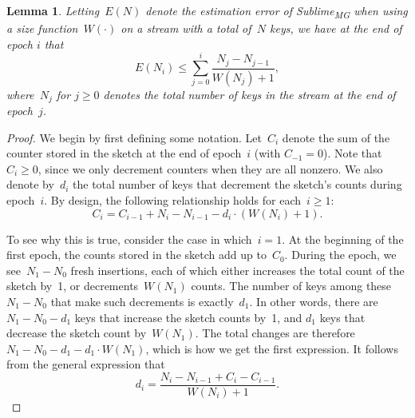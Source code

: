 \documentclass[sigconf]{acmart}
\newtheorem{lemma}[theorem]{Lemma}
\newcommand{\sketch}{Sublime}
\newcommand{\sketchmg}{\sketch\textsubscript{MG}\xspace}
\begin{document}
\begin{lemma}
    \label{lemma:mg-w}
    Letting~$E(N)$ denote the estimation error of \sketchmg when using a size
    function~$W(\cdot)$ on a stream with a total of~$N$ keys, we have at the
    end of epoch $i$ that
    $$ E(N_i) \leq \sum_{j=0}^i \frac{N_j - N_{j-1}}{W(N_j)+1},$$
    where~$N_{j}$ for $j\geq 0$ denotes the total number of keys in the stream
    at the end of epoch~$j$.
\end{lemma}
\begin{proof}
    We begin by first defining some notation. Let~$C_i$ denote the sum of the
    counter stored in the sketch at the end of epoch~$i$ (with $C_{-1}=0$).
    Note that $C_i \geq 0$, since we only decrement counters when they are all
    nonzero. We also denote by~$d_i$ the total number of keys that decrement
    the sketch's counts during epoch~$i$. By design, the following relationship
    holds for each~$i\geq 1$:
    $$ C_i = C_{i-1} + N_i - N_{i-1} - d_i \cdot (W(N_i)+1). $$

    To see why this is true, consider the case in which~$i=1$. At the beginning
    of the first epoch, the counts stored in the sketch add up to~$C_0$. During
    the epoch, we see~$N_1-N_0$ fresh insertions, each of which either
    increases the total count of the sketch by~1, or decrements~$W(N_1)$
    counts. The number of keys among these~$N_1-N_0$ that make such decrements
    is exactly~$d_1$. In other words, there are~$N_1-N_0-d_1$ keys that
    increase the sketch counts by~1, and $d_1$ keys that decrease the sketch
    count by~$W(N_1)$. The total changes are therefore~$N_1-N_0-d_1 - d_1 \cdot
    W(N_1)$, which is how we get the first expression. It follows from the
    general expression that 
    $$ d_i = \frac{N_i - N_{i-1} + C_i - C_{i-1}}{W(N_i)+1}. $$


\end{proof}
\end{document}
